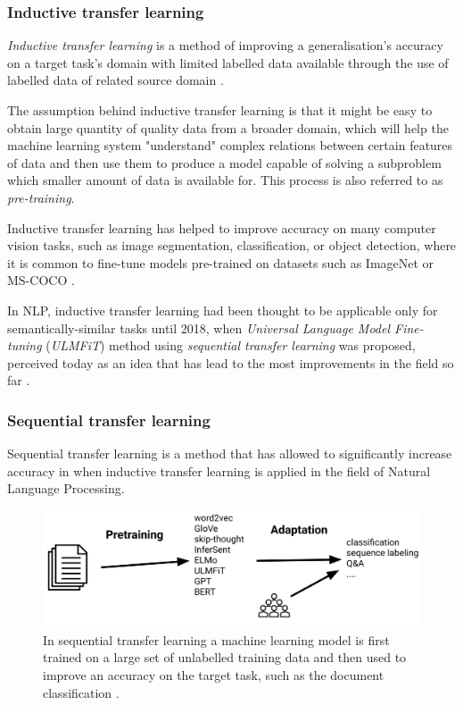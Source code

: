 \subsubsection{Inductive transfer learning}
\label{transferlearning:inductive}

\emph{Inductive transfer learning} is a method of improving a generalisation's accuracy on a target task's domain with limited labelled data available through the use of labelled data of related source domain \cite{inductivetl_def}.

The assumption behind inductive transfer learning is that it might be easy to obtain large quantity of quality data from a broader domain, which will help the machine learning system "understand" complex relations between certain features of data and then use them to produce a model capable of solving a subproblem which smaller amount of data is available for. This process is also referred to as \emph{pre-training}.

Inductive transfer learning has helped to improve accuracy on many computer vision tasks, such as image segmentation, classification, or object detection, where it is common to fine-tune models pre-trained on datasets such as ImageNet or MS-COCO \cite{ulmfit}.

In NLP, inductive transfer learning had been thought to be applicable only for semantically-similar tasks \cite{mou2016transferable} until 2018, when \emph{Universal Language Model Fine-tuning} (\emph{ULMFiT}) method \cite{ulmfit} using \emph{sequential transfer learning} was proposed, perceived today as an idea that has lead to the most improvements in the field so far \cite{state_of_nlp_2019}.


\subsubsection{Sequential transfer learning}

Sequential transfer learning is a method that has allowed to significantly increase accuracy in when inductive transfer learning is applied in the field of Natural Language Processing.

\begin{figure}[]
\centering
\includegraphics[scale=0.3]{figures/sequential.png}
\caption{In sequential transfer learning a machine learning model is first trained on a large set of unlabelled training data and then used to improve an accuracy on the target task, such as the document classification \cite{state_of_nlp_2019}.}
\end{figure}

